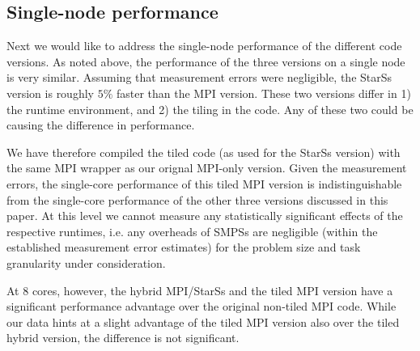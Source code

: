 \documentclass[conference]{IEEEtran}
\newcommand{\starss}{{StarSs}}
\begin{document}
\subsection{Single-node performance}
\label{sec:discuss_single}

Next we would like to address the single-node performance of the
different code versions. As noted above, the performance of the three
versions on a single node is very similar. Assuming that measurement
errors were negligible, the \starss{} version is roughly $5\%$ faster
than the MPI version. These two versions differ in 1) the runtime
environment, and 2) the tiling in the code. Any of these two
could be causing the difference in performance.

We have therefore compiled the tiled code (as used for the \starss{}
version) with the same MPI wrapper as our orignal MPI-only
version. Given the measurement errors, the single-core performance of
this tiled MPI version is indistinguishable from the single-core
performance of the other three versions discussed in this paper. At
this level we cannot measure any statistically significant effects of
the respective runtimes, i.e. any overheads of SMPSs are negligible
(within the established measurement error estimates) for the problem
size and task granularity under consideration. 

At 8 cores, however, the hybrid MPI/\starss{} and the tiled MPI
version have a significant performance advantage over the original
non-tiled MPI code. While our data hints at a slight advantage of the
tiled MPI version also over the tiled hybrid version, the difference
is not significant. 
\end{document}
